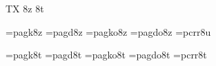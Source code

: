 
\ifx\ffdecl\undefined  \fi

\ffdecl [AvantGarde] {\rm \bf \it \bi} {\caps{\rm\bf}} {} {TX} {8z 8t}

\def\caps{\ffvars{k}{d}{!}{!}\ffsetV{caps}{c}\ffsetX} 
\def\nocaps{\ffsetX} 
\nocaps\relax %
\def\ffwarning#1{\ffmessage{FONT warning: AvantGarde - \string\caps#1 unavailable}}

\ismacro{}\ifttrue
   \font\tenrm=pagk8z   \sizespec
   \font\tenbf=pagd8z   \sizespec
   \font\tenit=pagko8z  \sizespec
   \font\tenbi=pagdo8z  \sizespec
   \font\tentt=pcrr8u   \sizespec
   \let\tensl=\tenit

   \def\ffnamegen{pag\ffvarV\capsV 8z}

   
\fi

\ismacro{}\ifttrue
   \font\tenrm=pagk8t   \sizespec
   \font\tenbf=pagd8t   \sizespec
   \font\tenit=pagko8t  \sizespec
   \font\tenbi=pagdo8t  \sizespec
   \font\tentt=pcrr8t   \sizespec
   \let\tensl=\tenit

   \def\ffnamegen{pag\ffvarV\capsV 8t}
\fi

\tenrm

\let\setsimplemath=\relax %

\def\agTeX{T\kern-.08em\lower.3333ex\hbox{E}\kern-0.09emX}
\ifx\origTeX\undefined \let\origTeX=\TeX \fi
\let\TeX=\agTeX

\ifx\loadmathfonts\relax \endinput \fi
\ifx\mathpreloaded X\else  \fi                     


